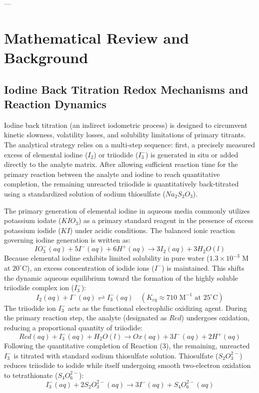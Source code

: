\documentclass[12pt]{article}
\begin{document}
---

\section{Mathematical Review and Background}

\subsection{Iodine Back Titration Redox Mechanisms and Reaction Dynamics}

Iodine back titration (an indirect iodometric process) is designed to circumvent kinetic slowness, volatility losses, and solubility limitations of primary titrants. The analytical strategy relies on a multi-step sequence: first, a precisely measured excess of elemental iodine ($I_2$) or triiodide ($I_3^-$) is generated in situ or added directly to the analyte matrix. After allowing sufficient reaction time for the primary reaction between the analyte and iodine to reach quantitative completion, the remaining unreacted triiodide is quantitatively back-titrated using a standardized solution of sodium thiosulfate ($Na_2S_2O_3$).

The primary generation of elemental iodine in aqueous media commonly utilizes potassium iodate ($KIO_3$) as a primary standard reagent in the presence of excess potassium iodide ($KI$) under acidic conditions. The balanced ionic reaction governing iodine generation is written as:
\begin{equation}
IO_3^-(aq) + 5I^-(aq) + 6H^+(aq) \longrightarrow 3I_2(aq) + 3H_2O(l)
\end{equation}
Because elemental iodine exhibits limited solubility in pure water ($1.3 \times 10^{-3} \text{ M}$ at $20^\circ\text{C}$), an excess concentration of iodide ions ($I^-$) is maintained. This shifts the dynamic aqueous equilibrium toward the formation of the highly soluble triiodide complex ion ($I_3^-$):
\begin{equation}
I_2(aq) + I^-(aq) \rightleftharpoons I_3^-(aq) \quad \left(K_{eq} \approx 710 \text{ M}^{-1} \text{ at } 25^\circ\text{C}\right)
\end{equation}
The triiodide ion $I_3^-$ acts as the functional electrophilic oxidizing agent. During the primary reaction step, the analyte (designated as $Red$) undergoes oxidation, reducing a proportional quantity of triiodide:
\begin{equation}
Red(aq) + I_3^-(aq) + H_2O(l) \longrightarrow Ox(aq) + 3I^-(aq) + 2H^+(aq)
\end{equation}
Following the quantitative completion of Reaction (3), the remaining, unreacted $I_3^-$ is titrated with standard sodium thiosulfate solution. Thiosulfate ($S_2O_3^{2-}$) reduces triiodide to iodide while itself undergoing smooth two-electron oxidation to tetrathionate ($S_4O_6^{2-}$):
\begin{equation}
I_3^-(aq) + 2S_2O_3^{2-}(aq) \longrightarrow 3I^-(aq) + S_4O_6^{2-}(aq)
\end{equation}
\end{document}
